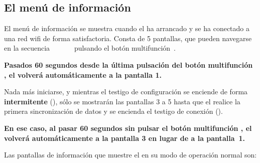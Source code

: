 \subsection{El menú de información}
\label{sec:menu-info}

El menú de información se muestra cuando el \MIE ha arrancado y se ha conectado a una red wifi de forma satisfactoria. Consta de 5 pantallas, que pueden navegarse en la secuencia
~~~
~~
pulsando el botón multifunción~.

\textbf{Pasados 60 segundos desde la última pulsación del botón multifunción , el \MI volverá automáticamente a la pantalla 1.}

Nada más iniciarse, y mientras el testigo de configuración  se enciende de forma \textbf{intermitente} (), sólo se mostrarán las pantallas 3 a 5 hasta que el \MEE realice la primera sincronización de datos y se encienda el testigo de conexión  ().

\textbf{En ese caso, al pasar 60 segundos sin pulsar el botón multifunción , el \MI volverá automáticamente a la pantalla 3 en lugar de a la pantalla~1.}
\attend

Las pantallas de información que muestre el \MIE en su modo de operación normal son:

